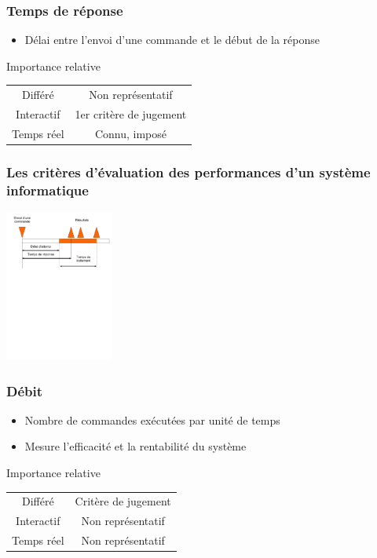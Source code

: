 \begin{frame}
\frametitle{Temps de réponse}
\begin{itemize}
\item Délai entre l’envoi d’une commande et le début de la réponse
\end{itemize}
\begin{block}{Importance relative}
\begin{tabular}{c|c}
Différé & Non représentatif \\
Interactif & 1er critère de jugement \\
Temps réel & Connu, imposé \\
\end{tabular}
\end{block}
\end{frame}


\begin{frame}
\frametitle{Les critères d'évaluation des performances d'un système informatique}
\includegraphics[height=5cm]{../illustration/criteres.pdf}
\end{frame}

\begin{frame}
\frametitle{Débit}
\begin{itemize}
\item Nombre de commandes exécutées par unité de temps
\item Mesure l'efficacité et la rentabilité du système
\end{itemize}
\begin{block}{Importance relative}
\begin{tabular}{c|c}
Différé & Critère de jugement \\
Interactif & Non représentatif \\
Temps réel & Non représentatif \\
\end{tabular}
\end{block}
\end{frame}




